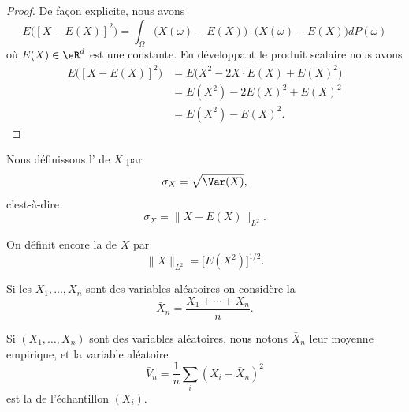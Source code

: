 \begin{proof}
	De façon explicite, nous avons
	\begin{equation}
		E\big( [X-E(X)]^2 \big)=\int_{\Omega}\big( X(\omega)-E(X) \big)\cdot\big( X(\omega)-E(X) \big)dP(\omega)
	\end{equation}
	où \( E(X)\in\eR^d\) est une constante. En développant le produit scalaire nous avons
	\begin{subequations}
		\begin{align}
			E\big( [X-E(X)]^2 \big) & =E\big( X^2-2X\cdot E(X)+E(X)^2 \big) \\
			                        & =E(X^2)-2E(X)^2+E(X)^2                \\
			                        & =E(X^2)-E(X)^2.
		\end{align}
	\end{subequations}
\end{proof}

\begin{definition}

	Nous définissons l' de \( X\) par
	\begin{equation}
		\sigma_X=\sqrt{\Var(X)},
	\end{equation}
	c'est-à-dire
	\begin{equation}
		\sigma_X=\| X-E(X) \|_{L^2}.
	\end{equation}
\end{definition}


\begin{definition}
	On définit encore la  de \( X\) par
	\begin{equation}
		\| X \|_{L^2}=\big[ E(X^2) \big]^{1/2}.
	\end{equation}
\end{definition}

\begin{definition}
	Si les \( X_1,\ldots,X_n\) sont des variables aléatoires on considère la 
	\begin{equation}
		\bar X_n=\frac{ X_1+\cdots+X_n }{ n }.
	\end{equation}
\end{definition}

\begin{definition}
	Si \( (X_1,\ldots,X_n)\) sont des variables aléatoires, nous notons \( \bar X_n\) leur moyenne empirique, et la variable aléatoire
	\begin{equation}
		\bar V_n=\frac{1}{ n }\sum_i(X_i-\bar X_n)^2
	\end{equation}
	est la  de l'échantillon \( (X_i)\).
\end{definition}

